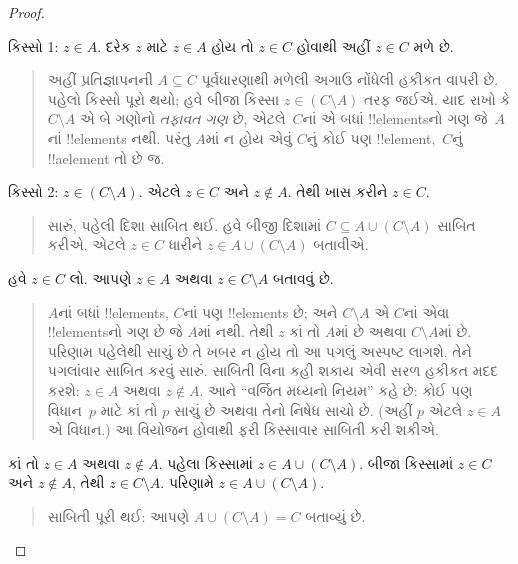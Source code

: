 \documentclass[../../../include/open-logic-section]{subfiles}
\begin{document}
\begin{proof}
\begin{quote}
  \end{quote}
  કિસ્સો 1: $z \in A$. દરેક $z$ માટે $z \in A$ હોય તો
  $z \in C$ હોવાથી અહીં $z \in C$ મળે છે.
  \begin{quote}
    અહીં પ્રતિજ્ઞાપનની $A \subseteq C$ પૂર્વધારણાથી મળેલી
    અગાઉ નોંધેલી હકીકત વાપરી છે. પહેલો કિસ્સો પૂરો થયો;
    હવે બીજા કિસ્સા $z \in (C
    \setminus A)$ તરફ જઈએ. યાદ રાખો કે $C \setminus A$ એ
    બે ગણોનો \emph{તફાવત ગણ} છે, એટલે~$C$નાં એ બધાં
    !!{element}sનો ગણ જે~$A$નાં !!{element}s નથી. પરંતુ
    $A$માં ન હોય એવું $C$નું કોઈ પણ !!{element},~$C$નું
    !!a{element} તો છે જ.
  \end{quote}
  કિસ્સો 2: $z \in (C \setminus A)$. એટલે $z \in C$ અને
  $z
  \notin A$. તેથી ખાસ કરીને $z \in C$.
  \begin{quote}
    સારું, પહેલી દિશા સાબિત થઈ. હવે બીજી દિશામાં
    $C \subseteq A \cup (C \setminus
    A)$ સાબિત કરીએ. એટલે $z \in C$ ધારીને $z \in A \cup (C
    \setminus A)$ બતાવીએ.
  \end{quote}
  હવે $z \in C$ લો. આપણે $z \in A$ અથવા $z \in C
  \setminus A$ બતાવવું છે.
  \begin{quote}
    $A$નાં બધાં !!{element}s, $C$નાં પણ !!{element}s છે;
    અને $C
    \setminus A$ એ $C$નાં એવા !!{element}sનો ગણ છે જે
    $A$માં નથી. તેથી $z$ કાં તો $A$માં છે અથવા $C
    \setminus A$માં છે. પરિણામ પહેલેથી સાચું છે તે ખબર ન હોય
    તો આ પગલું અસ્પષ્ટ લાગશે. તેને પગલાંવાર સાબિત કરવું સારું.
    સાબિતી વિના કહી શકાય એવી સરળ હકીકત મદદ કરશે:
    $z \in A$ અથવા $z \notin A$. આને ``વર્જિત મધ્યનો નિયમ''
    કહે છે: કોઈ પણ વિધાન~$p$ માટે કાં તો $p$ સાચું છે અથવા
    તેનો નિષેધ સાચો છે. (અહીં $p$ એટલે $z \in A$ એ વિધાન.)
    આ વિયોજન હોવાથી ફરી કિસ્સાવાર સાબિતી કરી શકીએ.
  \end{quote}
  કાં તો $z \in A$ અથવા $z \notin A$. પહેલા કિસ્સામાં
  $z \in A \cup
  (C \setminus A)$. બીજા કિસ્સામાં $z \in C$ અને
  $z \notin A$, તેથી $z \in C \setminus A$. પરિણામે
  $z \in A \cup (C \setminus A)$.
  \begin{quote}
    સાબિતી પૂરી થઈ: આપણે $A \cup (C \setminus A) = C$ બતાવ્યું છે.
  \end{quote}
\end{proof}
\end{document}
